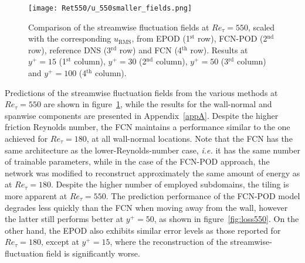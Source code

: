 \begin{figure}
\begin{center}
\texttt{[image: Ret550/u\_550smaller\_fields.png]}
\end{center}
\caption{\label{fig:field_comp550} Comparison of the streamwise fluctuation fields at $Re_{\tau} = 550$, scaled with the corresponding $u_\mathrm{RMS}$, from EPOD (1$^{\text{st}}$ row), FCN-POD (2$^{\text{nd}}$ row), reference DNS (3$^{\text{rd}}$ row) and FCN (4$^{\text{th}}$ row). Results at $y^+=15$ (1$^{\text{st}}$ column), $y^+=30$ (2$^{\text{nd}}$ column), $y^+=50$ (3$^{\text{rd}}$ column) and $y^+=100$ (4$^{\text{th}}$ column).}%
\end{figure}

Predictions of the streamwise fluctuation fields from the various methods at $Re_{\tau} = 550$ are shown in figure~\ref{fig:field_comp550}, while the results for the wall-normal and spanwise components are presented in Appendix~\ref{appA}.
Despite the higher friction Reynolds number, the FCN maintains a performance similar to the one achieved for $Re_{\tau}=180$, at all wall-normal locations.
Note that the FCN has the same architecture as the lower-Reynolds-number case, {\it i.e.} it has the same number of trainable parameters, while in the case of the FCN-POD approach, the network was modified to reconstruct approximately the same amount of energy as at $Re_{\tau}=180$.
Despite the higher number of employed subdomains, the tiling is more apparent at $Re_{\tau}=550$.
The prediction performance of the FCN-POD model degrades less quickly than the FCN when moving away from the wall, however the latter still performs better at $y^+=50$, as shown in figure~\ref{fig:loss550}.
On the other hand, the EPOD also exhibits similar error levels as those reported for $Re_{\tau}=180$, except at $y^+=15$, where the reconstruction of the streamwise-fluctuation field is significantly worse.

